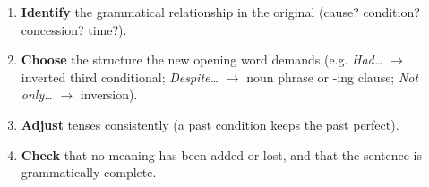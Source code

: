 \documentclass[11pt]{article}
\begin{document}
\begin{methode}
\begin{enumerate}
\item \textbf{Identify} the grammatical relationship in the original (cause? condition? concession? time?).
\item \textbf{Choose} the structure the new opening word demands (e.g. \emph{Had\ldots} $\rightarrow$ inverted third conditional; \emph{Despite\ldots} $\rightarrow$ noun phrase or -ing clause; \emph{Not only\ldots} $\rightarrow$ inversion).
\item \textbf{Adjust} tenses consistently (a past condition keeps the past perfect).
\item \textbf{Check} that no meaning has been added or lost, and that the sentence is grammatically complete.
\end{enumerate}
\end{methode}
\end{document}
